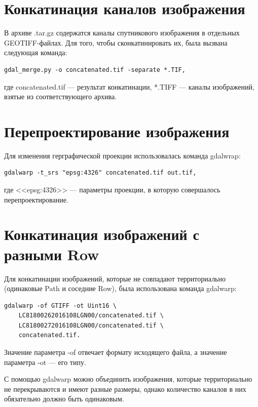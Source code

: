 \section{Конкатинация каналов изображения}

В архиве .tar.gz содержатся каналы спутникового изображения в отдельных GEOTIFF-файлах. Для того, чтобы сконкатинировать их, была вызвана следующая команда:

\lstset{language=bash}
\begin{lstlisting}
gdal_merge.py -o concatenated.tif -separate *.TIF,
\end{lstlisting}

где concatenated.tif --- результат конкатинации, *.TIFF --- каналы изображений, взятые из соответствующего архива.

\section{Перепроектирование изображения}

Для изменения герграфической проекции использовалась команда gdalwrap:

\lstset{language=bash}
\begin{lstlisting}
gdalwarp -t_srs "epsg:4326" concatenated.tif out.tif,
\end{lstlisting}

где <<epsg:4326>> --- параметры проекции, в которую совершалось перепроектирование.

\section{Конкатинация изображений с разными Row}

Для конкатинации изображений, которые не совпадают территориально (одинаковые Path и соседние Row), была использована команда gdalwarp:

\lstset{language=bash}
\begin{lstlisting}
gdalwarp -of GTIFF -ot Uint16 \
	LC81800262016108LGN00/concatenated.tif \
	LC81800272016108LGN00/concatenated.tif \
	concatenated.tif.
\end{lstlisting}

Значение параметра -of отвечает формату исходящего файла, а значение параметра -ot --- его типу.

С помощью gdalwarp можно объединить изображения, которые территориально не перекрываются и имеют разные размеры, однако количество каналов в них обязательно должно быть одинаковым.

